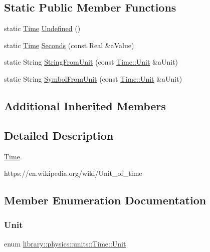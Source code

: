 \subsection*{Static Public Member Functions}
\begin{DoxyCompactItemize}
\item 
static \hyperlink{classlibrary_1_1physics_1_1units_1_1_time}{Time} \hyperlink{classlibrary_1_1physics_1_1units_1_1_time_a532c992968408dcb70f5ee94e672c595}{Undefined} ()
\item 
static \hyperlink{classlibrary_1_1physics_1_1units_1_1_time}{Time} \hyperlink{classlibrary_1_1physics_1_1units_1_1_time_a07132f52798140d876eaeef4292688d4}{Seconds} (const Real \&a\+Value)
\item 
static String \hyperlink{classlibrary_1_1physics_1_1units_1_1_time_a413c7045742e568efc2e0e2b64eb6c86}{String\+From\+Unit} (const \hyperlink{classlibrary_1_1physics_1_1units_1_1_time_ab876a6a05c9a2f28905f2753bfd64109}{Time\+::\+Unit} \&a\+Unit)
\item 
static String \hyperlink{classlibrary_1_1physics_1_1units_1_1_time_aa48f07fb50e09cd22b9b6b7a83275f39}{Symbol\+From\+Unit} (const \hyperlink{classlibrary_1_1physics_1_1units_1_1_time_ab876a6a05c9a2f28905f2753bfd64109}{Time\+::\+Unit} \&a\+Unit)
\end{DoxyCompactItemize}
\subsection*{Additional Inherited Members}


\subsection{Detailed Description}
\hyperlink{classlibrary_1_1physics_1_1units_1_1_time}{Time}. 

https\+://en.wikipedia.\+org/wiki/\+Unit\+\_\+of\+\_\+time 

\subsection{Member Enumeration Documentation}
\mbox{\label{classlibrary_1_1physics_1_1units_1_1_time_ab876a6a05c9a2f28905f2753bfd64109}} 
\subsubsection{\texorpdfstring{Unit}{Unit}}
{\footnotesize\ttfamily enum \hyperlink{classlibrary_1_1physics_1_1units_1_1_time_ab876a6a05c9a2f28905f2753bfd64109}{library\+::physics\+::units\+::\+Time\+::\+Unit}\hspace{0.3cm}{\ttfamily [strong]}}

